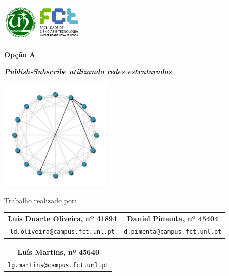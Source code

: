 \documentclass[12pt]{article}
\begin{document}
\begin{titlepage}
    \includegraphics[width=0.3\textwidth]{fctUnlLogo.jpg}
    \begin{center}
        \vspace{0.5cm}

        \begin{Large}
        	\underline{\textbf{Opção A}}\\
        \end{Large}
        
        \textbf{\emph{\emph{Publish-Subscribe} utilizando redes estruturadas}}
               
        \vspace{0.3cm}

		\includegraphics[width=0.4\textwidth]{Chord_network.png}
		
        \vspace{0.3cm}
        
        Trabalho realizado por:
        
        \vspace{0.5cm}

		\begin{table}[htbp]
		\centering
        	\begin{tabular}{c c}
				\textbf{Luís Duarte Oliveira, nº 41894} & \textbf{Daniel Pimenta, nº 45404}\\
				\texttt{ld.oliveira@campus.fct.unl.pt} & \texttt{d.pimenta@campus.fct.unl.pt}\\
			\end{tabular}
		\end{table}
		
		\begin{table}[htbp]
		\centering
        	\begin{tabular}{c}
				\textbf{Luís Martins, nº 45640}\\
				\texttt{lg.martins@campus.fct.unl.pt}\\
			\end{tabular}
		\end{table}
		

\end{center}
\end{titlepage}
\end{document}
